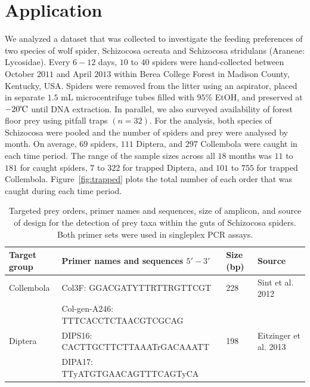 \section{Application}
\label{sec:data}

We analyzed a dataset that was collected to investigate the feeding preferences of two species of wolf spider, Schizocosa ocreata and Schizocosa stridulans (Araneae: Lycosidae).  Every $6-12$ days, $10$ to $40$ spiders were hand-collected between October $2011$ and April $2013$ within Berea College Forest in Madison County, Kentucky, USA.  Spiders were removed from the litter using an aspirator, placed in separate $1.5$ mL microcentrifuge tubes filled with $95$\% {\color{red}EtOH}, and preserved at $-20\celsius$ until DNA extraction.  In parallel, we also surveyed availability of forest floor prey using pitfall traps $(n = 32)$.  For the analysis, both species of Schizocosa were pooled and the number of spiders and prey were analysed by month.  On average, $69$ spiders, $111$ Diptera, and $297$ Collembola were caught in each time period.  The range of the sample sizes across all $18$ months was $11$ to $181$ for caught spiders, $7$ to $322$ for trapped Diptera, and $101$ to $755$ for trapped Collembola.  Figure~\ref{fig:trapped} plots the total number of each order that was caught during each time period.

\begin{table}
  \label{tab:s1}
  \centering
  \begin{tabular}{llll}
    \hline
    \textbf{Target group} & \textbf{Primer names and sequences} $5'-3'$ & \textbf{Size (bp)} & \textbf{Source}\\
    \hline
    Collembola & Col3F: GGACGATYTTRTTRGTTCGT & 228 & Sint et al. 2012 \\
    & Col-gen-A246: TTTCACCTCTAACGTCGCAG & & \\
    Diptera & DIPS16: CACTTGCTTCTTAAATrGACAAATT & 198 & Eitzinger et al. 2013 \\
    & DIPA17: TTyATGTGAACAGTTTCAGTyCA &  & \\
  \end{tabular}
  \caption{Targeted prey orders, primer names and sequences, size of amplicon, and source of design for the detection of prey taxa within the guts of Schizocosa spiders.  Both primer sets were used in singleplex PCR assays.}
\end{table}

